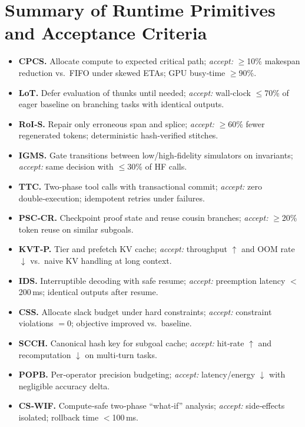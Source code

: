 \documentclass[
]{article}
\begin{document}
\section*{Summary of Runtime Primitives and Acceptance Criteria}
\begin{itemize}
  \item \textbf{CPCS.} Allocate compute to expected critical path; \emph{accept:} $\ge$10\% makespan reduction vs.\ FIFO under skewed ETAs; GPU busy‑time $\ge$90\%.
  \item \textbf{LoT.} Defer evaluation of thunks until needed; \emph{accept:} wall‑clock $\le$70\% of eager baseline on branching tasks with identical outputs.
  \item \textbf{RoI‑S.} Repair only erroneous span and splice; \emph{accept:} $\ge$60\% fewer regenerated tokens; deterministic hash‑verified stitches.
  \item \textbf{IGMS.} Gate transitions between low/high‑fidelity simulators on invariants; \emph{accept:} same decision with $\le$30\% of HF calls.
  \item \textbf{TTC.} Two‑phase tool calls with transactional commit; \emph{accept:} zero double‑execution; idempotent retries under failures.
  \item \textbf{PSC‑CR.} Checkpoint proof state and reuse cousin branches; \emph{accept:} $\ge$20\% token reuse on similar subgoals.
  \item \textbf{KVT‑P.} Tier and prefetch KV cache; \emph{accept:} throughput $\uparrow$ and OOM rate $\downarrow$ vs.\ naive KV handling at long context.
  \item \textbf{IDS.} Interruptible decoding with safe resume; \emph{accept:} preemption latency $<$200\,ms; identical outputs after resume.
  \item \textbf{CSS.} Allocate slack budget under hard constraints; \emph{accept:} constraint violations $=0$; objective improved vs.\ baseline.
  \item \textbf{SCCH.} Canonical hash key for subgoal cache; \emph{accept:} hit‑rate $\uparrow$ and recomputation $\downarrow$ on multi‑turn tasks.
  \item \textbf{POPB.} Per‑operator precision budgeting; \emph{accept:} latency/energy $\downarrow$ with negligible accuracy delta.
  \item \textbf{CS‑WIF.} Compute‑safe two‑phase ``what‑if'' analysis; \emph{accept:} side‑effects isolated; rollback time $<$100\,ms.
\end{itemize}
\end{document}
